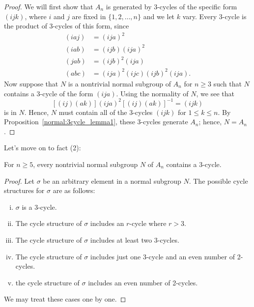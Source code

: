 { 
\begin{proof}
We will first show that $A_n$ is generated by 3-cycles of the specific
form $(ijk)$, where $i$ and $j$ are fixed in  $\{ 1, 2, \ldots, n \}$
and we let $k$ vary. Every 3-cycle is the product of 3-cycles of this 
form, since
\begin{align*}
(i a j) & = (i j a)^2  \\
(i a b) & = (i j b) (i j a)^2 \\
(j a b) & = (i j b)^2 (i j a) \\
(a b c) & = (i j a)^2 (i j c) (i j b)^2 (i j a).
\end{align*}
Now suppose that $N$ is a nontrivial normal subgroup of $A_n$ for $n 
\geq 3$  such that $N$ contains a 3-cycle of the form $(i j a)$. Using
the normality of $N$, we see that
\[
[(i j)(a k)](i j a)^2 [(i j)(a k)]^{-1} = (i j k)
\]
is in $N$. Hence, $N$ must contain all of the 3-cycles $(i j k)$ 
for $1 \leq k \leq n$. By Proposition~\ref{normal:3cycle_lemma1}, these 3-cycles generate $A_n$; 
hence, $N = A_n$. 
\end{proof}
\bigskip
 
\noindent
Let's move on to fact (2):

\begin{thm}\label{normal:3cycle_lemma3}
For $n \geq 5$, every nontrivial normal subgroup $N$ of $A_n$ contains a
$3$-cycle. 
\end{thm}

 
 
\begin{proof}
Let $\sigma$ be an arbitrary element in a normal subgroup $N$. The possible cycle structures for $\sigma$ are as follows:

\begin{enumerate}[(i)]
 \item
$\sigma$ is a 3-cycle.
 \item
The cycle structure of $\sigma$ includes an $r$-cycle where $r>3$.
\item
The cycle structure of $\sigma$ includes at least two 3-cycles.
\item
The cycle structure of $\sigma$ includes just one 3-cycle and an even number of 2-cycles. 
\item
the cycle structure of $\sigma$ includes an even
number of 2-cycles. 
\end{enumerate}

\noindent
We may treat these cases one by one.


\end{proof}}
